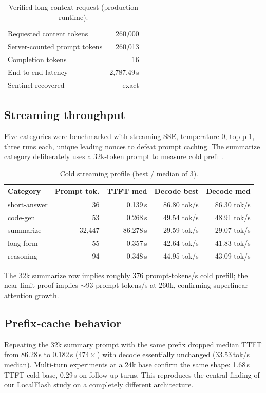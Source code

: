 \documentclass[11pt]{article}
\begin{document}
\begin{table}[h]
\centering
\caption{Verified long-context request (production runtime).}
\label{tab:ctx}
\begin{tabular}{lr}
\toprule
Requested content tokens & 260{,}000 \\
Server-counted prompt tokens & 260{,}013 \\
Completion tokens & 16 \\
End-to-end latency & 2{,}787.49\,s \\
Sentinel recovered & exact \\
\bottomrule
\end{tabular}
\end{table}

\subsection{Streaming throughput}
Five categories were benchmarked with streaming SSE, temperature 0, top-p 1,
three runs each, unique leading nonces to defeat prompt caching. The summarize
category deliberately uses a 32k-token prompt to measure cold prefill.

\begin{table}[h]
\centering
\caption{Cold streaming profile (best / median of 3).}
\label{tab:cold}
\begin{tabular}{lrrrr}
\toprule
Category & Prompt tok. & TTFT med & Decode best & Decode med \\
\midrule
short-answer & 36 & 0.139\,s & 86.80 tok/s & 86.30 tok/s \\
code-gen     & 53 & 0.268\,s & 49.54 tok/s & 48.91 tok/s \\
summarize    & 32{,}447 & 86.278\,s & 29.59 tok/s & 29.07 tok/s \\
long-form    & 55 & 0.357\,s & 42.64 tok/s & 41.83 tok/s \\
reasoning    & 94 & 0.348\,s & 44.95 tok/s & 43.09 tok/s \\
\bottomrule
\end{tabular}
\end{table}

The 32k summarize row implies roughly 376 prompt-tokens/s cold prefill; the
near-limit proof implies $\sim$93 prompt-tokens/s at 260k, confirming
superlinear attention growth.

\subsection{Prefix-cache behavior}
Repeating the 32k summary prompt with the same prefix dropped median TTFT from
86.28\,s to 0.182\,s ($474\times$) with decode essentially unchanged
(33.53\,tok/s median). Multi-turn experiments at a 24k base confirm the same
shape: 1.68\,s TTFT cold base, 0.29\,s on follow-up turns. This reproduces the
central finding of our LocalFlash study on a completely different architecture.
\end{document}
